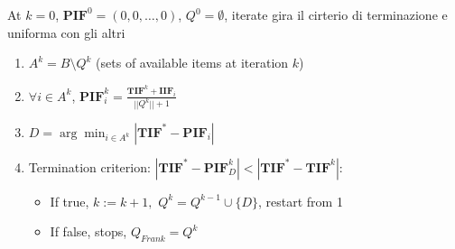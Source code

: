 \documentclass[12pt, a4paper, titilepage]{article}
\begin{document}
At $k =0$, $\mathbf{PIF}^0 = (0, 0, \ldots, 0)$, $Q^0 = \emptyset$, iterate
\alert{gira il cirterio di terminazione e uniforma con gli altri}
\begin{enumerate}
	\item  $A^k = B \setminus Q^k$ (sets of available items at iteration $k$)
	\item $\forall i \in A^k$, $\mathbf{PIF}_{i}^k = \frac{\mathbf{TIF}^k + \mathbf{IIF}_{i}}{||Q^k||+1}$
	\item $D = \arg \min_{i \in A^k} |\mathbf{TIF}^* - \mathbf{PIF}_i|$
	\item Termination criterion: $|\mathbf{TIF}^* - \mathbf{PIF}_D^{k}| < |\mathbf{TIF}^* - \mathbf{TIF}^{k}|$: 
	\begin{itemize}
		\item  If true, $k := k + 1,$ $Q^{k} = Q^{k-1} \cup \{D\}$, restart from 1 
		
		\item  If false, stops, $Q_{Frank} = Q^k$
		
	\end{itemize}
\end{enumerate}
\end{document}
